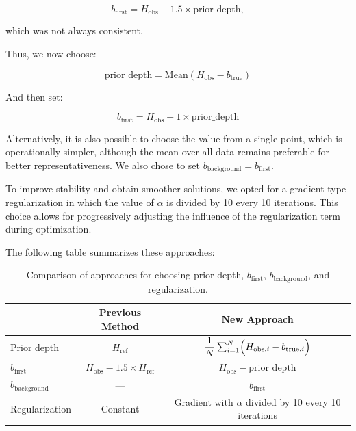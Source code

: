 \documentclass{article}
\begin{document}
\[
b_{\text{first}} = H_{\text{obs}} - 1.5 \times \text{prior depth},
\]

which was not always consistent.

Thus, we now choose:

\[
\text{prior\_depth} = \text{Mean}(H_{\text{obs}} - b_{\text{true}})
\]

And then set:

\[
b_{\text{first}} = H_{\text{obs}} - 1 \times \text{prior\_depth}
\]

Alternatively, it is also possible to choose the value from a single point, which is operationally simpler, although the mean over all data remains preferable for better representativeness. We also chose to set \( b_{\text{background}} = b_{\text{first}} \).

To improve stability and obtain smoother solutions, we opted for a gradient-type regularization in which the value of \( \alpha \) is divided by 10 every 10 iterations. This choice allows for progressively adjusting the influence of the regularization term during optimization.

The following table summarizes these approaches:

\begin{table}[H]
    \centering
    \begin{tabular}{|l|c|c|}
    \hline
                               & Previous Method & New Approach \\ \hline
    Prior depth              & \( H_{\text{ref}} \) & \( \dfrac{1}{N}\sum_{i=1}^{N}\Bigl( H_{\text{obs},i} - b_{\text{true},i}\Bigr) \) \\ \hline
    \( b_{\text{first}} \)     & \( H_{\text{obs}} - 1.5 \times H_{\text{ref}} \) & \( H_{\text{obs}} - \text{prior depth} \) \\ \hline
    \( b_{\text{background}} \) & --- & \( b_{\text{first}} \) \\ \hline
    Regularization           & Constant & Gradient with \( \alpha \) divided by 10 every 10 iterations \\ \hline
    \end{tabular}
    \caption{Comparison of approaches for choosing prior depth, \( b_{\text{first}} \), \( b_{\text{background}} \), and regularization.}
    \label{tab:prior_depth_bfirst}
\end{table}
\end{document}
